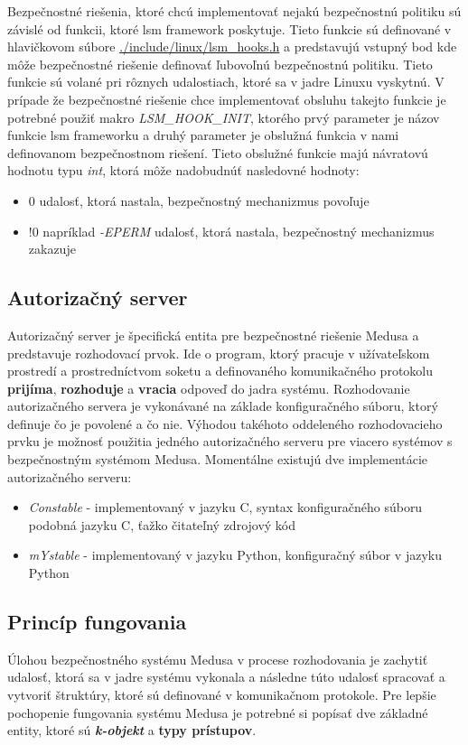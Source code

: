 Bezpečnostné riešenia, ktoré chcú implementovať nejakú bezpečnostnú politiku sú závislé od funkcii, ktoré \acrshort{lsm} framework poskytuje. Tieto funkcie sú definované v hlavičkovom súbore \url{./include/linux/lsm_hooks.h} a predstavujú vstupný bod kde môže bezpečnostné riešenie definovať ľubovoľnú bezpečnostnú politiku. Tieto funkcie sú volané pri rôznych udalostiach, ktoré sa v jadre Linuxu vyskytnú. V prípade že bezpečnostné riešenie chce implementovať obsluhu takejto funkcie je potrebné použiť makro \textit{LSM\_HOOK\_INIT}, ktorého prvý parameter je názov funkcie \acrshort{lsm} frameworku a druhý parameter je obslužná funkcia v nami definovanom bezpečnostnom riešení.\cite{medusavilo} Tieto obslužné funkcie majú návratovú hodnotu typu \textit{int}, ktorá môže nadobudnúť nasledovné hodnoty:
\begin{itemize}
\item 0 udalosť, ktorá nastala, bezpečnostný mechanizmus povoľuje
\item !0 napríklad \textit{-EPERM} udalosť, ktorá nastala, bezpečnostný mechanizmus zakazuje
\end{itemize}
 
\subsection{Autorizačný server}
Autorizačný server je špecifická entita pre bezpečnostné riešenie Medusa a predstavuje rozhodovací prvok. Ide o program, ktorý pracuje v užívateľskom prostredí a prostredníctvom soketu a definovaného komunikačného protokolu \textbf{prijíma}, \textbf{rozhoduje} a \textbf{vracia} odpoveď do jadra systému. Rozhodovanie autorizačného servera je vykonávané na základe konfiguračného súboru, ktorý definuje čo je povolené a čo nie. Výhodou takéhoto oddeleného rozhodovacieho prvku je možnosť použitia jedného autorizačného serveru pre viacero systémov s bezpečnostným systémom Medusa. Momentálne existujú dve implementácie autorizačného serveru:
\begin{itemize}
\item \textit{Constable} - implementovaný v jazyku C, syntax konfiguračného súboru podobná jazyku C, ťažko čitateľný zdrojový kód 
\item \textit{mYstable} - implementovaný v jazyku Python, konfiguračný súbor v jazyku Python
\end{itemize}

\subsection{Princíp fungovania}
Úlohou bezpečnostného systému Medusa v procese rozhodovania je zachytiť udalosť, ktorá sa v jadre systému vykonala a následne túto udalosť spracovať a vytvoriť štruktúry, ktoré sú definované v komunikačnom protokole. Pre lepšie pochopenie fungovania systému Medusa je potrebné si popísať dve základné entity, ktoré sú \textbf{\textit{k-objekt}} a \textbf{typy prístupov}.
